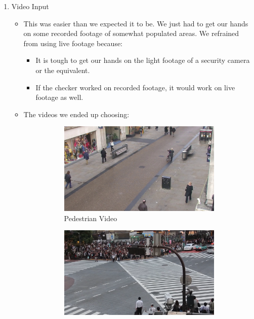 \documentclass[a4paper]{article}
\begin{document}
\begin{enumerate}
    \item Video Input
          \begin{itemize}[label={}]
              \item This was easier than we expected it to be. We just had to get our hands
                    on some recorded footage of somewhat populated areas. We refrained from using live
                    footage because:
                    \begin{itemize}
                        \item It is tough to get our hands on the light footage of a security camera or the equivalent.
                        \item If the checker worked on recorded footage, it would work on live footage as well.
                    \end{itemize}
                    \pagebreak
              \item The videos we ended up choosing:
                    \begin{figure}[h!]
                        \centering
                        \begin{subfigure}[b]{0.4\linewidth}
                            \includegraphics[width=\linewidth]{Pictures/pedestrian.jpg}
                            \caption{Pedestrian Video}
                        \end{subfigure}
                        \begin{subfigure}[b]{0.4\linewidth}
                            \includegraphics[width=\linewidth]{Pictures/shibuya.png}

\end{subfigure}
\end{figure}
\end{itemize}
\end{enumerate}
\end{document}

